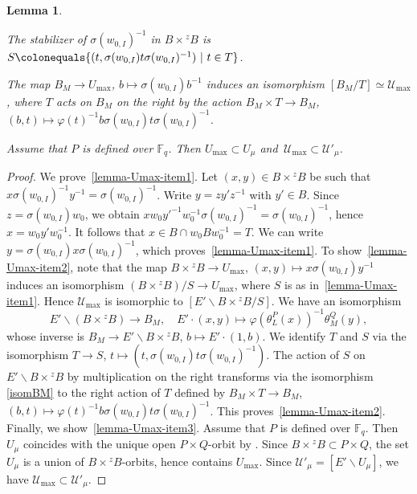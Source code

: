 \documentclass[11pt]{amsart}
\numberwithin{equation}{section}
\newtheorem{lemma}[theorem]{Lemma}
\theoremstyle{definition}
\theoremstyle{remark}
\newcommand{\Ucal}{{\mathcal U}}
\newcommand{\FF}{\mathbb{F}}
\newcommand{\lra}{\longrightarrow}
\begin{document}
\begin{lemma} \label{lemma-Umax} \ 
\begin{assertionlist}
    \item \label{lemma-Umax-item1} The stabilizer of $\sigma(w_{0,I})^{-1}$ in $B\times {}^z B$ is $S\colonequals \{(t,\sigma(w_{0,I}) t\sigma(w_{0,I})^{-1}) \ | \ t\in T\}$.
    \item \label{lemma-Umax-item2} The map $B_M\to U_{\max}$, $b\mapsto \sigma(w_{0,I})b^{-1}$ induces an isomorphism $[B_M/T]\simeq \Ucal_{\max}$, where $T$ acts on $B_M$ on the right by the action $B_M\times T\to B_M$, $(b,t)\mapsto \varphi(t)^{-1} b \sigma(w_{0,I}) t \sigma(w_{0,I})^{-1}$.
    \item \label{lemma-Umax-item3} Assume that $P$ is defined over $\FF_q$. Then $U_{\max}\subset U_{\mu}$ and\, $\Ucal_{\max} \subset \Ucal'_{\mu}$.
\end{assertionlist}
\end{lemma}

\begin{proof}
We prove~\eqref{lemma-Umax-item1}. Let $(x,y)\in B\times {}^zB$ be such that $x\sigma(w_{0,I})^{-1} y^{-1}=\sigma(w_{0,I})^{-1}$. Write $y=zy'z^{-1}$ with $y'\in B$. Since $z=\sigma(w_{0,I})w_0$, we obtain $x w_0 y'^{-1}w_0^{-1}\sigma(w_{0,I})^{-1}=\sigma(w_{0,I})^{-1}$, hence $x = w_0 y' w_0^{-1}$. It follows that $x\in B\cap w_{0}Bw_{0}^{-1}=T$. We can write $y=\sigma(w_{0,I}) x\sigma(w_{0,I})^{-1}$, which proves~\eqref{lemma-Umax-item1}.
To show~\eqref{lemma-Umax-item2}, note that the map $B\times {}^zB\to U_{\max}$, $(x,y)\mapsto x \sigma(w_{0,I}) y^{-1}$ induces an isomorphism $(B\times {}^zB)/S \to U_{\max}$, where $S$ is as in~\eqref{lemma-Umax-item1}. 
Hence $\Ucal_{\max}$ is isomorphic to $[E' \backslash B\times {}^z B / S]$. We have an isomorphism 
\begin{equation} \label{isomBM}
E'\backslash (B\times {}^z B) \lra B_M, \quad  E'\cdot (x,y)\longmapsto \varphi\left(\theta^P_L(x)\right)^{-1}\theta^Q_M(y),
\end{equation}
whose inverse is $B_M \to E'\backslash B\times {}^zB$, $b\mapsto E'\cdot (1,b)$. We identify $T$ and $S$ via the isomorphism $T\to S$, $t\mapsto (t,\sigma(w_{0,I}) t\sigma(w_{0,I})^{-1})$. The action of $S$ on $E'\backslash B\times {}^zB$ by multiplication on the right transforms via the isomorphism \eqref{isomBM} to the right action of $T$ defined by $B_M \times T \to B_M$, $(b,t)\mapsto \varphi(t)^{-1} b \sigma(w_{0,I}) t \sigma(w_{0,I})^{-1}$. This proves~\eqref{lemma-Umax-item2}. 
Finally, we show~\eqref{lemma-Umax-item3}. Assume that $P$ is defined over $\FF_q$. Then $U_{\mu}$ coincides with the unique open $P\times Q$-orbit by \cite[Corollary 2.15]{Wedhorn-bruhat}. 
Since $B\times {}^z B\subset P\times Q$, the set $U_{\mu}$ is a union of $B\times {}^z B$-orbits, hence contains $U_{\max}$. Since $\Ucal'_{\mu}=[E'\backslash U_{\mu}]$, we have $\Ucal_{\max} \subset \Ucal'_{\mu}$.
\end{proof}
\end{document}
